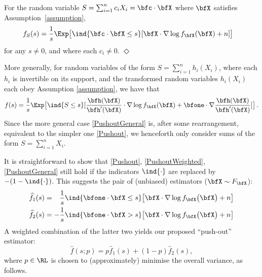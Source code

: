 \begin{corollary} \label{cor:WeightedSums}
For the random variable $S = \sum_{i=1}^n c_i X_i = \bfc \cdot \bfX$
where $\bfX$ satisfies Assumption~\ref{assumption},
\begin{align} \label{PushoutWeighted}
f_S(s)
&= \frac{1}{s} \Exp \bigl[ \ind{\bfc \cdot \bfX \le s} [ \bfX \cdot \nabla \log f_{\bfX}(\bfX) + n ] \bigr]
\end{align}
for any $s \not= 0$, and where each $c_i \not=0$. \hfill $\Diamond$
\end{corollary}

More generally, for random variables of the form $S = \sum_{i=1}^n h_i(X_i)$, where each $h_i$ is invertible on its support, and the transformed random variables $h_i(X_i)$ each obey Assumption \ref{assumption}, we have that
\begin{equation} \label{PushoutGeneral}
f(s) = \frac{1}{s} \Exp\bigl[ \ind{S \le s} [ \frac{\bfh(\bfX)}{\bfh'(\bfX)} \cdot \nabla \log f_{\bfX}(\bfX) + \bfone \cdot \nabla \frac{\bfh(\bfX)}{\bfh'(\bfX)} ] \bigr] \,.
\end{equation}
Since the more general  case \eqref{PushoutGeneral} is, after some rearrangement, equivalent to the simpler one  \eqref{Pushout},  we henceforth only consider  sums of the form $S = \sum_{i=1}^n X_i$.

It is straightforward to show that \eqref{Pushout}, \eqref{PushoutWeighted}, \eqref{PushoutGeneral} still hold if the indicators $\ind{\cdot}$ are replaced by $-(1-\ind{\cdot})$. This  suggests the pair of  (unbiased)  estimators ($\bfX \sim F_{\bfX}$):
\[
\begin{split}
\widehat{f}_{1}(s)& = \hphantom{-} \frac{1}{s} \ind{\bfone \cdot \bfX \le s} \bigl[ \bfX \cdot \nabla \log f_{\bfX}\bigl(\bfX\bigr) + n \bigr] \\
\widehat{f}_{2}(s)& = -\frac{1}{s} \ind{\bfone \cdot \bfX > s} \bigl[ \bfX \cdot \nabla \log f_{\bfX}\bigl(\bfX\bigr) + n \bigr]
\end{split}
\]
A weighted combination of  the latter two yields our  proposed ``push-out'' estimator:
\begin{equation} \label{MixtureEstimator}
\widehat{f}(s ; p) = p \widehat{f}_{1}(s) + (1-p) \widehat{f}_{2}(s),
\end{equation}
where $p \in \RL$ is chosen to (approximately) minimise the overall variance, as follows.

